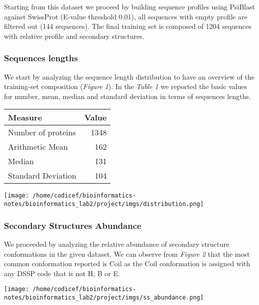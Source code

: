 \documentclass[a4paper,twocolumn]{article}
\begin{document}
Starting from this dataset we proceed by building sequence profiles using
PsiBlast \cite{psiblast} against SwissProt (E-value threshold 0.01), all sequences with empty profile are filtered
out (144 sequences). The final training set is composed of 1204 sequences with
relative profile and secondary structures.

\subsubsection{Sequences lengths}
\label{sec:orgee9aac3}
We start by analyzing the sequence length distribution to have an overview of
the training-set composition (\emph{Figure 1}). In the \emph{Table 1} we reported the basic values
for number, mean, median and standard deviation in terms of sequences lengths.

\begin{center}
\begin{tabular}{lr}
Measure & Value\\
\hline
Number of proteins & 1348\\
Arithmetic Mean & 162\\
Median & 131\\
Standard Deviation & 104\\
\end{tabular}
\end{center}




\begin{center}
\texttt{[image: /home/codicef/bioinformatics-notes/bioinformatics\_lab2/project/imgs/distribution.png]}
\end{center}


\subsubsection{Secondary Structures Abundance}
\label{sec:orga4e5d1d}
We proceeded by analyzing the relative abundance of secondary structure
conformations in the given dataset. We can observe from \emph{Figure 2} that the most
common conformation reported is Coil as the Coil conformation is assigned with
any DSSP code that is not H, B or E.

\begin{center}
\texttt{[image: /home/codicef/bioinformatics-notes/bioinformatics\_lab2/project/imgs/ss\_abundance.png]}
\end{center}
\end{document}
